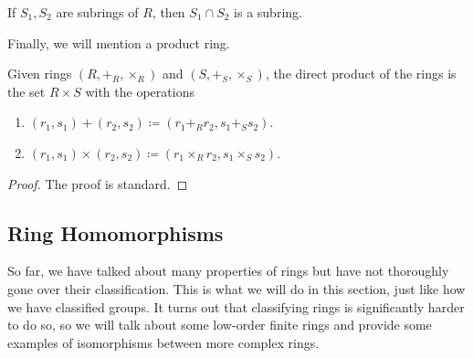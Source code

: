   \begin{theorem}
    If $S_1, S_2$ are subrings of $R$, then $S_1 \cap S_2$ is a subring. 
  \end{theorem}

  Finally, we will mention a product ring. 

  \begin{definition}
    Given rings $(R, +_R, \times_R)$ and $(S, +_S, \times_S)$, the direct product of the rings is the set $R \times S$ with the operations 
    \begin{enumerate}
      \item $(r_1, s_1) + (r_2, s_2) \coloneqq (r_1 +_R r_2, s_1 +_S s_2)$. 
      \item $(r_1, s_1) \times (r_2, s_2) \coloneqq (r_1 \times_R r_2, s_1 \times_S s_2)$. 
    \end{enumerate}
  \end{definition}
  \begin{proof}
    The proof is standard. 
  \end{proof}

\subsection{Ring Homomorphisms}

  So far, we have talked about many properties of rings but have not thoroughly gone over their classification. This is what we will do in this section, just like how we have classified groups. It turns out that classifying rings is significantly harder to do so, so we will talk about some low-order finite rings and provide some examples of isomorphisms between more complex rings. 

